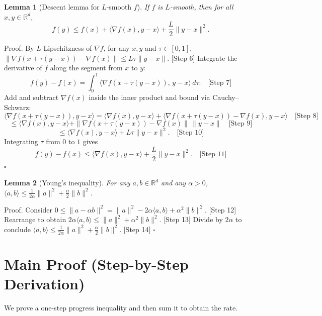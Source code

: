 \documentclass{article}
\newtheorem{lemma}{Lemma}
\newcommand{\R}{\mathbb{R}}
\begin{document}
\begin{lemma}[Descent lemma for $L$-smooth $f$]
If $f$ is $L$-smooth, then for all $x,y \in \R^d$,
\[
f(y) \le f(x) + \langle \nabla f(x), y-x\rangle + \frac{L}{2}\|y-x\|^2.
\]
\end{lemma}
\noindent Proof.
By $L$-Lipschitzness of $\nabla f$, for any $x,y$ and $\tau \in [0,1]$,
$\|\nabla f(x+\tau(y-x)) - \nabla f(x)\| \le L\tau \|y-x\|$. [Step 6]
Integrate the derivative of $f$ along the segment from $x$ to $y$:
\[
f(y) - f(x) = \int_{0}^{1} \langle \nabla f(x+\tau(y-x)),\, y-x\rangle \, d\tau. \quad \text{[Step 7]}
\]
Add and subtract $\nabla f(x)$ inside the inner product and bound via Cauchy--Schwarz:
\[
\langle \nabla f(x+\tau(y-x)), y-x\rangle 
= \langle \nabla f(x), y-x\rangle + \langle \nabla f(x+\tau(y-x))-\nabla f(x), y-x\rangle \quad \text{[Step 8]}
\]
\[
\le \langle \nabla f(x), y-x\rangle + \|\nabla f(x+\tau(y-x))-\nabla f(x)\|\,\|y-x\| \quad \text{[Step 9]}
\]
\[
\le \langle \nabla f(x), y-x\rangle + L\tau \|y-x\|^2. \quad \text{[Step 10]}
\]
Integrating $\tau$ from $0$ to $1$ gives
\[
f(y) - f(x) \le \langle \nabla f(x), y-x\rangle + \frac{L}{2}\|y-x\|^2. \quad \text{[Step 11]}
\]
\hfill $\square$

\begin{lemma}[Young's inequality]
For any $a,b \in \R^d$ and any $\alpha>0$, $\langle a,b\rangle \le \frac{1}{2\alpha}\|a\|^2 + \frac{\alpha}{2}\|b\|^2$.
\end{lemma}
\noindent Proof.
Consider $0 \le \|a - \alpha b\|^2 = \|a\|^2 - 2\alpha \langle a,b\rangle + \alpha^2\|b\|^2$. [Step 12]
Rearrange to obtain $2\alpha \langle a,b\rangle \le \|a\|^2 + \alpha^2\|b\|^2$. [Step 13]
Divide by $2\alpha$ to conclude $\langle a,b\rangle \le \frac{1}{2\alpha}\|a\|^2 + \frac{\alpha}{2}\|b\|^2$. [Step 14]
\hfill $\square$

\section*{Main Proof (Step-by-Step Derivation)}
We prove a one-step progress inequality and then sum it to obtain the rate.
\end{document}
